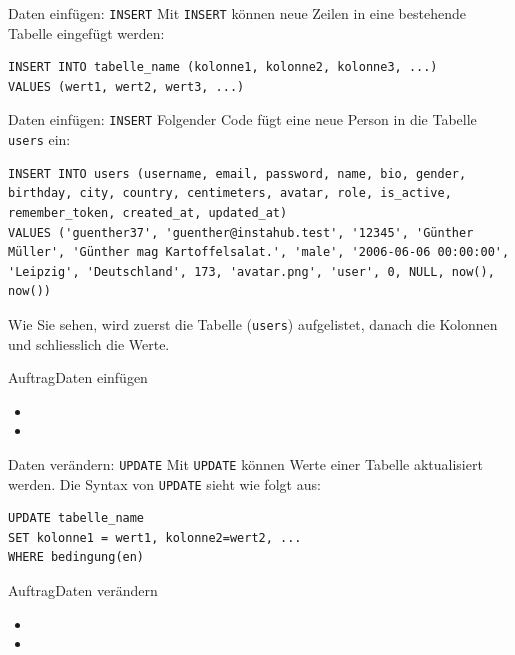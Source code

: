 \begin{frame}[fragile]{Daten einfügen: \texorpdfstring{\lstinline|INSERT|}{INSERT}}
Mit \lstinline|INSERT| können neue Zeilen in eine bestehende Tabelle eingefügt werden:

\begin{lstlisting}
INSERT INTO tabelle_name (kolonne1, kolonne2, kolonne3, ...)
VALUES (wert1, wert2, wert3, ...)
\end{lstlisting}
\end{frame}

\begin{frame}[fragile]{Daten einfügen: \texorpdfstring{\lstinline|INSERT|}{INSERT}}
Folgender Code fügt eine neue Person in die Tabelle \texttt{users} ein:
\begin{lstlisting}
INSERT INTO users (username, email, password, name, bio, gender, birthday, city, country, centimeters, avatar, role, is_active, remember_token, created_at, updated_at)
VALUES ('guenther37', 'guenther@instahub.test', '12345', 'Günther Müller', 'Günther mag Kartoffelsalat.', 'male', '2006-06-06 00:00:00', 'Leipzig', 'Deutschland', 173, 'avatar.png', 'user', 0, NULL, now(), now())
\end{lstlisting}
Wie Sie sehen, wird zuerst die Tabelle (\texttt{users}) aufgelistet, danach die Kolonnen und schliesslich die Werte.
\end{frame}

\begin{frame}{Auftrag}{Daten einfügen}
\begin{itemize}
	\item {}
	\item {}
\end{itemize}
\end{frame}

\begin{frame}[fragile]{Daten verändern: \texorpdfstring{\lstinline|UPDATE|}{UPDATE}}
Mit \lstinline|UPDATE| können Werte einer Tabelle aktualisiert werden. Die Syntax von \lstinline|UPDATE| sieht wie folgt aus:

\begin{lstlisting}
UPDATE tabelle_name
SET kolonne1 = wert1, kolonne2=wert2, ...
WHERE bedingung(en)
\end{lstlisting}
\end{frame}

\begin{frame}{Auftrag}{Daten verändern}
\begin{itemize}
	\item {}
	\item {}
\end{itemize}
\end{frame}

